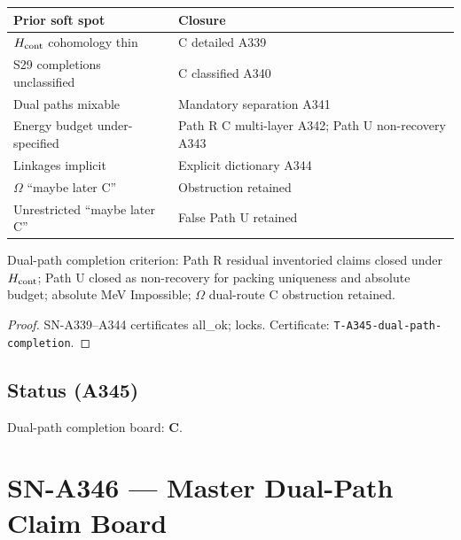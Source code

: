 \begin{theorem}
\label{thm:A345}
\begin{center}
\begin{tabular}{@{}p{5.2cm}p{6.6cm}@{}}
\toprule
Prior soft spot & Closure \\
\midrule
$H_{\rm cont}$ cohomology thin & C detailed A339 \\
S29 completions unclassified & C classified A340 \\
Dual paths mixable & Mandatory separation A341 \\
Energy budget under-specified & Path R C multi-layer A342; Path U non-recovery A343 \\
Linkages implicit & Explicit dictionary A344 \\
$\Omega$ ``maybe later C'' & Obstruction retained \\
Unrestricted ``maybe later C'' & False Path U retained \\
\bottomrule
\end{tabular}
\end{center}
Dual-path completion criterion: Path R residual inventoried claims closed under $H_{\rm cont}$; Path U closed as non-recovery for packing uniqueness and absolute budget; absolute MeV Impossible; $\Omega$ dual-route C obstruction retained.
\end{theorem}

\begin{proof}
SN-A339--A344 certificates all\_ok; locks. Certificate: \texttt{T-A345-dual-path-completion}.
\end{proof}

\subsection*{Status (A345)}
Dual-path completion board: \textbf{C}.

\section{SN-A346 --- Master Dual-Path Claim Board}
\label{sec:SN-A346}

